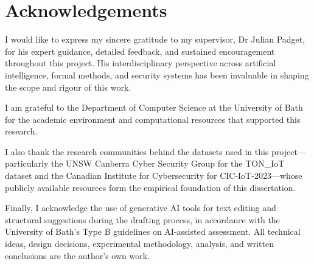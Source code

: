 \documentclass[12pt,a4paper]{report}
\begin{document}
\begin{abstract}
On TON\_IoT, all four tabular models achieve PR-AUC of 1.000 and ROC-AUC of 1.000 under the behaviour-only regime, with XGBoost achieving the highest OXS explanation quality score of 0.828. Cross-dataset evaluation on CIC-IoT-2023 reveals that tree ensemble models suffer catastrophic ROC-AUC drops of up to 87\%, while Logistic Regression generalises most robustly (ROC-AUC drop of 7.3\%). The leakage interaction analysis demonstrates that including identifier features reduces explanation plausibility by 35 percentage points (Cohen's $d = -2.985$) without affecting detection performance.
\end{abstract}

\newpage
\section*{Acknowledgements}
I would like to express my sincere gratitude to my supervisor, Dr Julian Padget, for his expert guidance, detailed feedback, and sustained encouragement throughout this project. His interdisciplinary perspective across artificial intelligence, formal methods, and security systems has been invaluable in shaping the scope and rigour of this work.

I am grateful to the Department of Computer Science at the University of Bath for the academic environment and computational resources that supported this research.

I also thank the research communities behind the datasets used in this project---particularly the UNSW Canberra Cyber Security Group for the TON\_IoT dataset and the Canadian Institute for Cybersecurity for CIC-IoT-2023---whose publicly available resources form the empirical foundation of this dissertation.

Finally, I acknowledge the use of generative AI tools for text editing and structural suggestions during the drafting process, in accordance with the University of Bath's Type B guidelines on AI-assisted assessment. All technical ideas, design decisions, experimental methodology, analysis, and written conclusions are the author's own work.

\tableofcontents
\listoftables
\listoffigures

\end{document}
